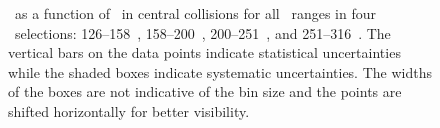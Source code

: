 \begin{figure}
   \caption{\DeltaDptr\ as a function of \rvar\ in central collisions for all \pt\ ranges in four \ptjet\ selections: 126--158~\GeV, 158--200~\GeV, 200--251~\GeV, and 251--316~\GeV.
The vertical bars on the data points indicate statistical uncertainties while the shaded boxes indicate systematic uncertainties.
The widths of the boxes are not indicative of the bin size and the points are shifted horizontally for better visibility.
}
      \label{fig:deltadptr}
\end{figure}
\FloatBarrier


